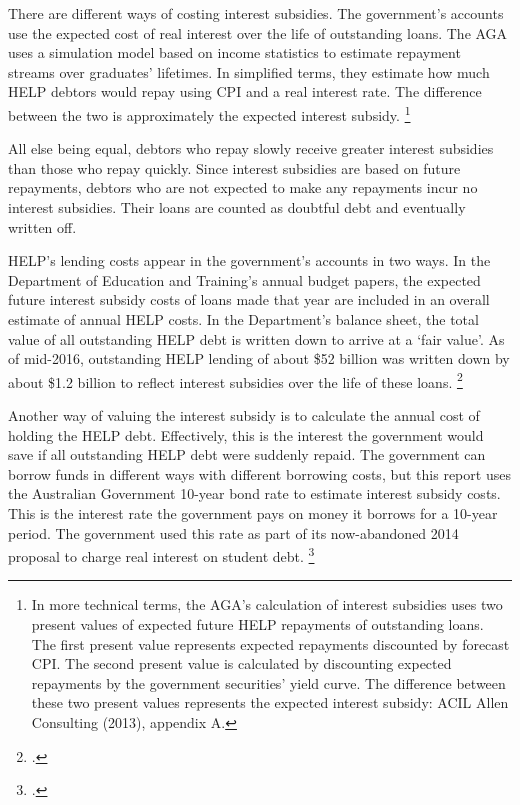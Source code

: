 \documentclass[embargoed]{grattan}
\begin{document}
There are different ways of costing interest subsidies.
The government's accounts use the expected cost of real interest over the life of outstanding loans.
The \gls{AGA} uses a simulation model based on income statistics to estimate repayment streams over graduates' lifetimes.
In simplified terms, they estimate how much \gls{HELP} debtors would repay using \gls{CPI} and a real interest rate.
The difference between the two is approximately the expected interest subsidy.%
\footnote{In more technical terms, the \gls{AGA}'s calculation of interest subsidies uses two present values of expected future \gls{HELP} repayments of outstanding loans.
The first present value represents expected repayments discounted by forecast \gls{CPI}.
The second present value is calculated by discounting expected repayments by the government securities' yield curve.
The difference between these two present values represents the expected interest subsidy: ACIL Allen Consulting (2013), appendix A.}

All else being equal, debtors who repay slowly receive greater interest subsidies than those who repay quickly.
Since interest subsidies are based on future repayments, debtors who are not expected to make any repayments incur no interest subsidies.
Their loans are counted as doubtful debt and eventually written off.

\gls{HELP}'s lending costs appear in the government's accounts in two ways.
In the Department of Education and Training's annual budget papers, the expected future interest subsidy costs of loans made that year are included in an overall estimate of annual \gls{HELP} costs.
In the Department's balance sheet, the total value of all outstanding \gls{HELP} debt is written down to arrive at a `fair value'.
As of mid-2016, outstanding \gls{HELP} lending of about \$52 billion was written down by about \$1.2 billion to reflect interest subsidies over the life of these loans.%
\footcite[][176]{Education2016Annualreport}

Another way of valuing the interest subsidy is to calculate the annual cost of holding the \gls{HELP} debt.
Effectively, this is the interest the government would save if all outstanding \gls{HELP} debt were suddenly repaid.
The government can borrow funds in different ways with different borrowing costs, but this report uses the Australian Government 10-year bond rate to estimate interest subsidy costs.
This is the interest rate the government pays on money it borrows for a 10-year period.
The government used this rate as part of its now-abandoned 2014 proposal to charge real interest on student debt.%
\footcite{Australia2014HigherEducationResearch}
\end{document}
